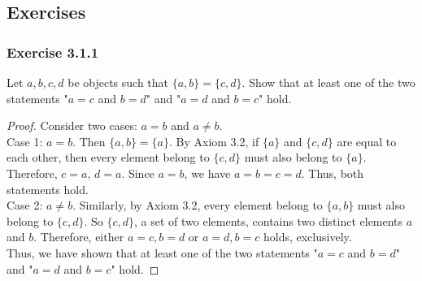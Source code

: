 \documentclass[12pt, letter]{article}
\begin{document}
\subsection*{Exercises}
\subsubsection*{Exercise 3.1.1}
Let $a,b,c,d$ be objects such that $\{a,b\}=\{c,d\}$. Show that at least one of the two statements "$a=c$ and $b=d$" and "$a=d$ and $b=c$" hold.
\begin{proof}
    Consider two cases: $a=b$ and $a\ne b$.\\
    Case 1: $a=b$. Then $\{a,b\}=\{a\}$. By Axiom 3.2, if $\{a\}$ and $\{c,d\}$ are equal to each other, then every element belong to $\{c,d\}$ must also belong to $\{a\}$. 
    Therefore, $c=a$, $d=a$. Since $a=b$, we have $a=b=c=d$. Thus, both statements hold.\\
    Case 2: $a\ne b$. Similarly, by Axiom 3.2, every element belong to $\{a,b\}$ must also belong to $\{c,d\}$. So $\{c,d\}$, a set of two elements, contains two distinct elements $a$ and $b$. Therefore, 
    either $a=c, b=d$ or $a=d, b=c$ holds, exclusively.\\
    Thus, we have shown that at least one of the two statements "$a=c$ and $b=d$" and "$a=d$ and $b=c$" hold.
\end{proof}
\end{document}
